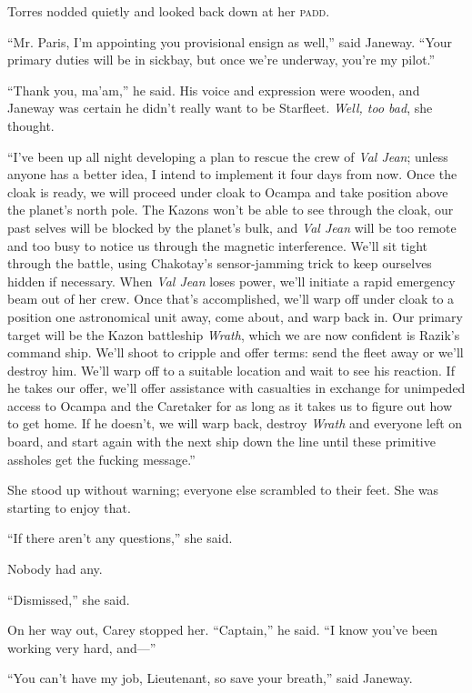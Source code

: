 \documentclass[twoside,letterpaper,12pt]{memoir}
\begin{document}
Torres nodded quietly and looked back down at her \textsc{padd}. 

``Mr. Paris, I'm appointing you provisional ensign as well,'' said Janeway. ``Your primary duties will be in sickbay, but once we're underway, you're my pilot.'' 

``Thank you, ma'am,'' he said. His voice and expression were wooden, and Janeway was certain he didn't really want to be Starfleet. \textit{Well, too bad}, she thought. 

``I've been up all night developing a plan to rescue the crew of \textit{Val Jean}; unless anyone has a better idea, I intend to implement it four days from now. Once the cloak is ready, we will proceed under cloak to Ocampa and take position above the planet's north pole. The Kazons won't be able to see through the cloak, our past selves will be blocked by the planet's bulk, and \textit{Val Jean} will be too remote and too busy to notice us through the magnetic interference. We'll sit tight through the battle, using Chakotay's sensor-jamming trick to keep ourselves hidden if necessary. When \textit{Val Jean} loses power, we'll initiate a rapid emergency beam out of her crew. Once that's accomplished, we'll warp off under cloak to a position one astronomical unit away, come about, and warp back in. Our primary target will be the Kazon battleship \textit{Wrath}, which we are now confident is Razik's command ship. We'll shoot to cripple and offer terms: send the fleet away or we'll destroy him. We'll warp off to a suitable location and wait to see his reaction. If he takes our offer, we'll offer assistance with casualties in exchange for unimpeded access to Ocampa and the Caretaker for as long as it takes us to figure out how to get home. If he doesn't, we will warp back, destroy \textit{Wrath} and everyone left on board, and start again with the next ship down the line until these primitive assholes get the fucking message.'' 

She stood up without warning; everyone else scrambled to their feet. She was starting to enjoy that. 

``If there aren't any questions,'' she said. 

Nobody had any. 

``Dismissed,'' she said. 

On her way out, Carey stopped her. ``Captain,'' he said. ``I know you've been working very hard, and---'' 

``You can't have my job, Lieutenant, so save your breath,'' said Janeway. 
\end{document}

